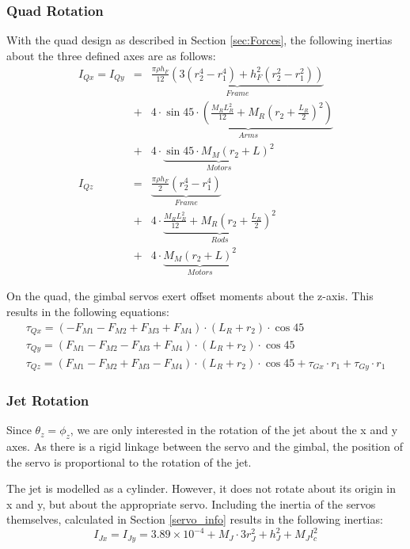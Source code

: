 \documentclass[11pt,twoside]{article}
\begin{document}
\subsubsection{Quad Rotation}
With the quad design as described in Section \ref{sec:Forces}, the following inertias about the three defined axes are as follows:
\begin{eqnarray}
    I_{Qx} = I_{Qy} & = & \underbrace{\frac{\pi \rho h_F}{12}(3(r_2^4-r_1^4) + h_F^2(r_2^2-r_1^2))}_{Frame} \nonumber \\ & + & 4 \cdot \underbrace{\sin 45 \cdot (\frac{M_R L_R^2}{12}+M_R(r_2+\frac{L_R}{2})^2)}_{Arms} \nonumber \\ & + & 4 \cdot \underbrace{\sin 45 \cdot M_M(r_2+L)^2}_{Motors} \\
    I_{Qz} & = & \underbrace{\frac{\pi \rho h_F}{2}(r_2^4-r_1^4)}_{Frame} \nonumber \\ & + & 4 \cdot \underbrace{\frac{M_RL_R^2}{12} + M_R(r_2+\frac{L_R}{2})^2}_{Rods} \nonumber \\ & + & 4 \cdot \underbrace{M_M(r_2+L)^2}_{Motors}
\end{eqnarray}

On the quad, the gimbal servos exert offset moments about the z-axis. This results in the following equations:
\begin{eqnarray}
    \tau_{Qx} = (-F_{M1} - F_{M2} + F_{M3} + F_{M4})\cdot(L_R + r_2)\cdot \cos{45} \\
    \tau_{Qy} = (F_{M1} - F_{M2} - F_{M3} + F_{M4})\cdot(L_R + r_2)\cdot \cos{45} \\
    \tau_{Qz} = (F_{M1} - F_{M2} + F_{M3} - F_{M4})\cdot(L_R + r_2)\cdot \cos{45} + \tau_{Gx}\cdot r_1 + \tau_{Gy}\cdot r_1
\end{eqnarray}

\subsubsection{Jet Rotation}
Since $\theta_z = \phi_z$, we are only interested in the rotation of the jet about the x and y axes. As there is a rigid linkage between the servo and the gimbal, the position of the servo is proportional to the rotation of the jet.

The jet is modelled as a cylinder. However, it does not rotate about its origin in x and y, but about the appropriate servo. Including the inertia of the servos themselves, calculated in Section \ref{servo_info} results in the following inertias:
\begin{equation}
    I_{Jx} = I_{Jy} = 3.89\times10^{-4} + M_J\cdot3r_J^2 + h_J^2 + M_Jl_c^2
\end{equation}
\end{document}
